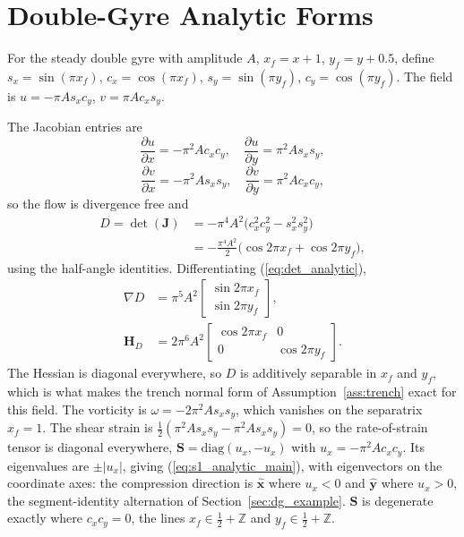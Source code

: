 \documentclass[lettersize,journal]{IEEEtran}
\begin{document}
\appendices

\section{Double-Gyre Analytic Forms}
\label{app:analytic}

For the steady double gyre with amplitude $A$, $x_f = x + 1$,
$y_f = y + 0.5$, define $s_x = \sin(\pi x_f)$, $c_x = \cos(\pi x_f)$,
$s_y = \sin(\pi y_f)$, $c_y = \cos(\pi y_f)$. The field is
$u = -\pi A s_x c_y$, $v = \pi A c_x s_y$.

The Jacobian entries are
\begin{equation}
    \frac{\partial u}{\partial x} = -\pi^2 A c_x c_y, \quad
    \frac{\partial u}{\partial y} =  \pi^2 A s_x s_y,
\end{equation}
\begin{equation}
    \frac{\partial v}{\partial x} = -\pi^2 A s_x s_y, \quad
    \frac{\partial v}{\partial y} =  \pi^2 A c_x c_y,
\end{equation}
so the flow is divergence free and
\begin{equation}
    \begin{split}
    D = \det(\mathbf{J})
      &= -\pi^4 A^2 \bigl(c_x^2 c_y^2 - s_x^2 s_y^2\bigr) \\
      &= -\frac{\pi^4 A^2}{2}\bigl(\cos 2\pi x_f + \cos 2\pi y_f\bigr),
    \end{split}
    \label{eq:det_analytic}
\end{equation}
using the half-angle identities. Differentiating
(\ref{eq:det_analytic}),
\begin{equation}
    \begin{aligned}
    \nabla D &= \pi^5 A^2
    \begin{bmatrix} \sin 2\pi x_f \\ \sin 2\pi y_f \end{bmatrix},
    \\
    \mathbf{H}_D &= 2\pi^6 A^2
    \begin{bmatrix} \cos 2\pi x_f & 0 \\ 0 & \cos 2\pi y_f \end{bmatrix}.
    \end{aligned}
    \label{eq:gradhess_analytic}
\end{equation}
The Hessian is diagonal everywhere, so $D$ is additively separable in
$x_f$ and $y_f$, which is what makes the trench normal form of
Assumption~\ref{ass:trench} exact for this field. The vorticity is
$\omega = -2\pi^2 A s_x s_y$, which vanishes on the separatrix
$x_f = 1$. The shear strain is $\tfrac{1}{2}(\pi^2 A s_x s_y - \pi^2 A
s_x s_y) = 0$, so the rate-of-strain tensor is diagonal everywhere,
$\mathbf{S} = \mathrm{diag}(u_x, -u_x)$ with $u_x = -\pi^2 A c_x c_y$.
Its eigenvalues are $\pm|u_x|$, giving (\ref{eq:s1_analytic_main}),
with eigenvectors on the coordinate axes: the compression direction is
$\hat{\mathbf{x}}$ where $u_x < 0$ and $\hat{\mathbf{y}}$ where $u_x >
0$, the segment-identity alternation of Section~\ref{sec:dg_example}.
$\mathbf{S}$ is degenerate exactly where $c_x c_y = 0$, the lines
$x_f \in \tfrac{1}{2} + \mathbb{Z}$ and $y_f \in \tfrac{1}{2} +
\mathbb{Z}$.
\end{document}
